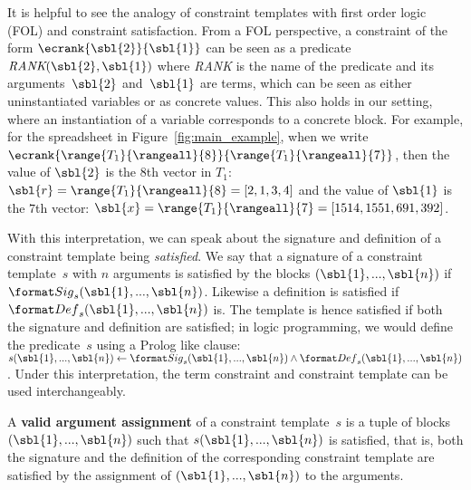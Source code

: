 It is helpful to see the analogy of constraint templates with first order logic (FOL) and constraint satisfaction.
From a FOL perspective, a constraint of the form $\ecrank{\sbl{2}}{\sbl{1}}$ can be seen as a predicate $\textit{RANK}(\sbl{2}, \sbl{1})$ where \textit{RANK} is the name of the predicate and its arguments~$\sbl{2}$ and~$\sbl{1}$ are terms, which can be seen as either uninstantiated variables or as concrete values.
This also holds in our setting, where an instantiation of a variable corresponds to a concrete block.
For example, for the spreadsheet in Figure~\ref{fig:main_example}, when we write $\ecrank{\range{T_1}{\rangeall}{8}}{\range{T_1}{\rangeall}{7}}$, then the value of $\sbl{2}$ is the $8$th vector in $T_1$: $\sbl{r} = \range{T_1}{\rangeall}{8} = [2,1,3,4]$ and the value of $\sbl{1}$ is the $7$th vector: $\sbl{x} = \range{T_1}{\rangeall}{7} = [1514, 1551, 691, 392]$.


With this interpretation, we can speak about the signature and definition of a constraint template being \textit{satisfied}.
We say that a signature of a constraint template~$s$ with $n$ arguments is satisfied by the blocks $(\sbl{1}, ..., \sbl{n})$ if $\sigc(\sbl{1}, ..., \sbl{n})$. Likewise a definition is satisfied if $\defc(\sbl{1}, ..., \sbl{n})$ is.
The template is hence satisfied if both the signature and definition are satisfied; in logic programming, we would define the predicate~$s$ using a Prolog like clause: $s(\sbl{1}, ..., \sbl{n}) \leftarrow \sigc(\sbl{1}, ..., \sbl{n}) \wedge \defc(\sbl{1}, ..., \sbl{n})$.
Under this interpretation, the term constraint and constraint template can be used interchangeably.

\begin{definition}
A \textbf{valid argument assignment} of a constraint template~$s$ is a tuple of blocks $(\sbl{1}, ..., \sbl{n})$ such that $s(\sbl{1}, ..., \sbl{n})$ is satisfied, that is, both the signature and the definition of the corresponding constraint template are satisfied by the assignment of $(\sbl{1}, ..., \sbl{n})$ to the arguments.
\end{definition}





